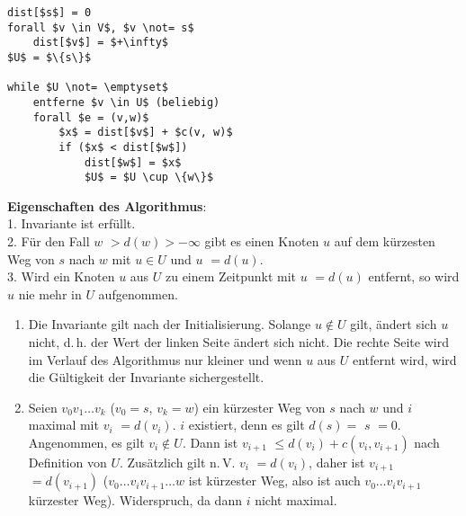 \begin{lstlisting}
dist[$s$] = 0
forall $v \in V$, $v \not= s$
    dist[$v$] = $+\infty$
$U$ = $\{s\}$

while $U \not= \emptyset$
    entferne $v \in U$ (beliebig)
    forall $e = (v,w)$
        $x$ = dist[$v$] + $c(v, w)$
        if ($x$ < dist[$w$])
            dist[$w$] = $x$
            $U$ = $U \cup \{w\}$
\end{lstlisting}

\linie

\textbf{Eigenschaften des Algorithmus}: \\
1. Invariante ist erfüllt. \\
2. Für den Fall \code{dist[}$w$\code{]} $> d(w) > -\infty$ gibt es einen
Knoten $u$ auf dem kürzesten Weg von $s$ nach $w$ mit
$u \in U$ und \code{dist[}$u$\code{]} $= d(u)$. \\
3. Wird ein Knoten $u$ aus $U$ zu einem Zeitpunkt mit
\code{dist[}$u$\code{]} $= d(u)$ entfernt, so wird $u$ nie mehr in
$U$ aufgenommen.

\begin{Beweis}
    \begin{enumerate}
        \item
        Die Invariante gilt nach der Initialisierung.
        Solange $u \notin U$ gilt, ändert sich \code{dist[}$u$\code{]}
        nicht, d.\,h. der Wert der linken Seite ändert sich nicht.
        Die rechte Seite wird im Verlauf des Algorithmus nur kleiner
        und wenn $u$ aus $U$ entfernt wird, wird die Gültigkeit der
        Invariante sichergestellt.
        
        \item
        Seien $v_0 v_1 \dotsc v_k$ ($v_0 = s$, $v_k = w$) ein kürzester Weg
        von $s$ nach $w$ und $i$ maximal mit
        \code{dist[}$v_i$\code{]} $= d(v_i)$.
        $i$ existiert, denn es gilt $d(s) =$ \code{dist[}$s$\code{]} $= 0$.
        Angenommen, es gilt $v_i \notin U$.
        Dann ist \code{dist[}$v_{i+1}$\code{]} $\le d(v_i) + c(v_i, v_{i+1})$
        nach Definition von $U$.
        Zusätzlich gilt n.\,V. \code{dist[}$v_i$\code{]} $= d(v_i)$, daher
        ist \code{dist[}$v_{i+1}$\code{]} $= d(v_{i+1})$
        ($v_0 \dotsc v_i v_{i+1} \dotsc w$ ist kürzester Weg, also ist auch
        $v_0 \dotsc v_i v_{i+1}$ kürzester Weg).
        Widerspruch, da dann $i$ nicht maximal.
    \end{enumerate}
\end{Beweis}

\linie
\pagebreak


